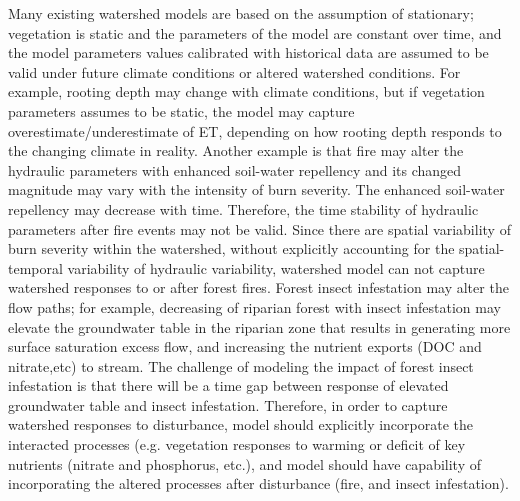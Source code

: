 \documentclass[preprint,review, 12pt]{elsarticle}
\begin{document}
Many existing watershed models are based on the assumption of stationary\citep{Wagener2010}; vegetation is static and the parameters of the model are constant over time, and the model parameters values calibrated with historical data are assumed to be valid under future climate conditions or altered watershed conditions. For example, rooting depth may change with climate conditions, but if vegetation parameters assumes to be static, the model may capture overestimate/underestimate of ET, depending on how rooting depth responds to the changing climate in reality. Another example is that fire may alter the hydraulic parameters with enhanced soil-water repellency and its changed magnitude may vary with the intensity of burn severity\citep{Ebel2014}. The enhanced soil-water repellency may decrease with time. Therefore, the time stability of hydraulic parameters after fire events may not be valid. Since there are spatial variability of burn severity within the watershed, without explicitly accounting for the spatial-temporal variability of hydraulic variability, watershed model can not capture watershed responses to or after forest fires. Forest insect infestation may alter the flow paths\citep{Ebel2014}; for example, decreasing of riparian forest with insect infestation may elevate the groundwater table in the riparian zone that results in generating more surface saturation excess flow, and increasing the nutrient exports (DOC and nitrate,etc) to stream. The challenge of modeling the impact of forest insect infestation is that there will be a time gap between response of elevated groundwater table and insect infestation. Therefore, in order to capture watershed responses to disturbance, model should explicitly incorporate the interacted processes (e.g. vegetation responses to warming or deficit of key nutrients (nitrate and phosphorus, etc.), and model should have capability of incorporating the altered processes after disturbance (fire, and insect infestation). 

\end{document}
